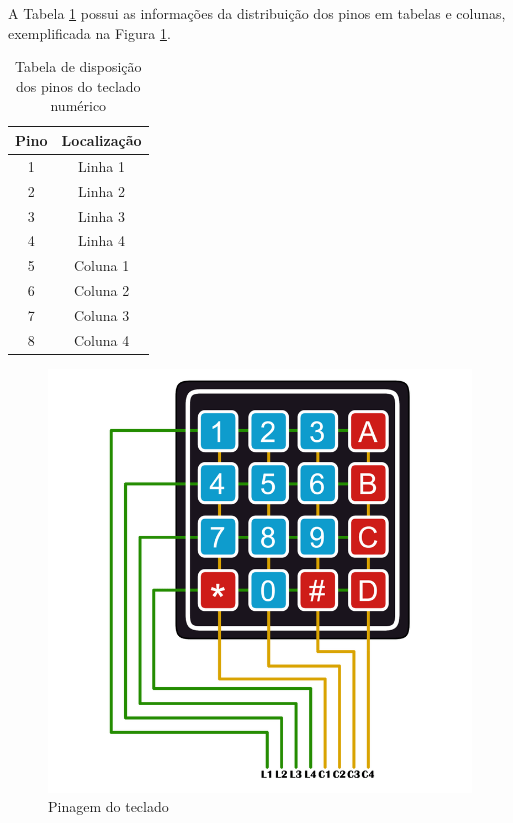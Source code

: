 A Tabela \ref{table:pinosteclado} possui as informações da distribuição dos pinos em tabelas e colunas, exemplificada na Figura \ref{fig:teclado-pins}.

\begin{table}[h!]
	\begin{center}
		\begin{tabular}{ |c|c| }
			\hline
			\rowcolor{lightgray} Pino & Localização \\
			 \hline 
				1 & Linha 1 \\
			 \hline 
				2 & Linha 2 \\
			 \hline 
				3 & Linha 3 \\
			 \hline 
				4 & Linha 4 \\
			 \hline 
				5 & Coluna 1 \\
			 \hline 
				6 & Coluna 2 \\
			 \hline 
				7 & Coluna 3 \\
			 \hline 
				8 & Coluna 4 \\
			\hline
		\end{tabular}
	\caption{Tabela de disposição dos pinos do teclado numérico}
	\label{table:pinosteclado}
	\end{center}
\end{table}

\begin{figure}[htbp]
	\centering
	\includegraphics[scale=0.3]{figuras/keypad-1024x1024-pins.png}
	\caption{Pinagem do teclado}
	\label{fig:teclado-pins}
\end{figure}

